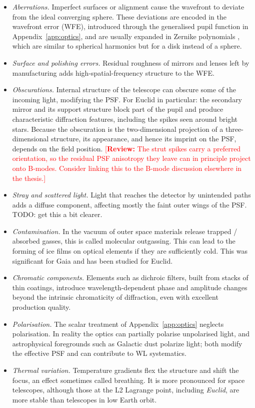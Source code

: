 \documentclass[11pt]{book}
\newcommand{\reviewnote}[1]{\textcolor{red}{[\textbf{Review:} #1]}}
\begin{document}
\begin{itemize}
\item \textit{Aberrations.} Imperfect surfaces or alignment cause the wavefront to deviate from the ideal converging sphere. These deviations are encoded in the wavefront error (WFE), introduced through the generalised pupil function in Appendix~\ref{app:optics}, and are usually expanded in Zernike polynomials \cite{noll1976}, which are similar to spherical harmonics but for a disk instead of a sphere.
\item \textit{Surface and polishing errors.} Residual roughness of mirrors and lenses left by manufacturing adds high-spatial-frequency structure to the WFE.
\item \textit{Obscurations.} Internal structure of the telescope can obscure some of the incoming light, modifying the PSF. For Euclid in particular: the secondary mirror and its support structure block part of the pupil and produce characteristic diffraction features, including the spikes seen around bright stars. Because the obscuration is the two-dimensional projection of a three-dimensional structure, its appearance, and hence its imprint on the PSF, depends on the field position. \reviewnote{The strut spikes carry a preferred orientation, so the residual PSF anisotropy they leave can in principle project onto B-modes. Consider linking this to the B-mode discussion elsewhere in the thesis.}
\item \textit{Stray and scattered light.} Light that reaches the detector by unintended paths adds a diffuse component, affecting mostly the faint outer wings of the PSF. TODO: get this a bit clearer.
\item \textit{Contamination.} In the vacuum of outer space materials release trapped / absorbed gasses, this is called molecular outgassing. This can lead to the forming of ice films on optical elements if they are sufficiently cold. This was significant for Gaia and has been studied for Euclid.
\item \textit{Chromatic components.} Elements such as dichroic filters, built from stacks of thin coatings, introduce wavelength-dependent phase and amplitude changes beyond the intrinsic chromaticity of diffraction, even with excellent production quality.
\item \textit{Polarisation.} The scalar treatment of Appendix~\ref{app:optics} neglects polarisation. In reality the optics can partially polarise unpolarised light, and astrophysical foregrounds such as Galactic dust polarize light; both modify the effective PSF and can contribute to WL systematics.
\item \textit{Thermal variation.} Temperature gradients flex the structure and shift the focus, an effect sometimes called breathing. It is more pronounced for space telescopes, although those at the L2 Lagrange point, including \textit{Euclid}, are more stable than telescopes in low Earth orbit.
\end{itemize}
\end{document}
